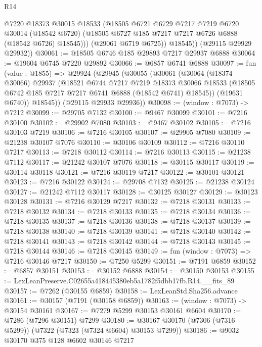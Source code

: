 \begin{lexlean}{R14}
\begin{coremodule}
              @7220
              @18373
              @30015
              @18533
              (@18505
                @6721
                @6729
                @7217
                @7219
                @6720
                @30014
                (@18542 @6720)
                (@18505 @6727 @185 @7217 @7217 @6726 @6888 (@18542 @6726) @18545)))
            (@29061 @6719 @6725))
          @18545))
      (@29115 @29929 @29932))
@30061 := @18505 @6746 @185 @29893 @7217 @29937 @6888
@30064 := @19604 @6745 @7220 @29892
@30066 := @6857 @6741 @6888
@30097 := fun (value : @1855) =>
  @29924
    (@29945
      (@30055
        (@30061
          (@30064
            (@18374 @30066)
            @29937
            (@18521
              @6744
              @7217
              @7219
              @18373
              @30066
              @18533
              (@18505 @6742 @185 @7217 @7217 @6741 @6888 (@18542 @6741) @18545))
            (@19631 @6740))
          @18545))
      (@29115 @29933 @29936))
@30098 := (window : @7073) -> @7212
@30099 := @29705 @7132
@30100 := @9467 @30099
@30101 := @7216 @30100
@30102 := @29902 @7080
@30103 := @9467 @30102
@30105 := @7216 @30103 @7219
@30106 := @7216 @30105
@30107 := @29905 @7080
@30109 := @21238 @30107 @7076
@30110 := @30106 @30109
@30112 := @7216 @30110 @7217
@30113 := @7218 @30112
@30114 := @7216 @30113
@30115 := @21238 @7112
@30117 := @21242 @30107 @7076
@30118 := @30115 @30117
@30119 := @30114 @30118
@30121 := @7216 @30119 @7217
@30122 := @30101 @30121
@30123 := @7216 @30122
@30124 := @29708 @7132
@30125 := @21238 @30124
@30127 := @21242 @7112 @30117
@30128 := @30125 @30127
@30129 := @30123 @30128
@30131 := @7216 @30129 @7217
@30132 := @7218 @30131
@30133 := @7218 @30132
@30134 := @7218 @30133
@30135 := @7218 @30134
@30136 := @7218 @30135
@30137 := @7218 @30136
@30138 := @7218 @30137
@30139 := @7218 @30138
@30140 := @7218 @30139
@30141 := @7218 @30140
@30142 := @7218 @30141
@30143 := @7218 @30142
@30144 := @7218 @30143
@30145 := @7218 @30144
@30146 := @7218 @30145
@30149 := fun (window : @7073) => @7216 @30146 @7217
@30150 := @7250 @5299
@30151 := @7191 @6859
@30152 := @6857 @30151
@30153 := @30152 @6888
@30154 := @30150 @30153
@30155 := LexLeanPreserve.C02655a418445380eb5a1782f5dbb17fb.R14.__fits_89
@30157 := @7262 (@30155 @6859)
@30158 := LexLeanStd.Sha256.advance
@30161 := @30157 (@7191 (@30158 @6859))
@30163 := (window : @7073) -> @30154 @30161
@30167 := @7279 @5299 @30153 @30161 @6604
@30170 := @7286 (@7296 @30151) @7299
@30180 := @30167 @30170 (@7306 (@7316 @5299)) (@7322 (@7323 (@7324 @6604) @30153 @7299))
@30186 := @9032 @30170 @375 @128 @6602 @30146 @7217

\end{coremodule}
\end{lexlean}
